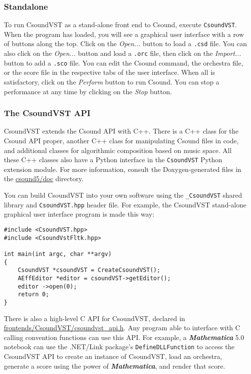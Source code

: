 \documentclass[10pt,letterpaper,onecolumn]{ltxguide}
\begin{document}
\subsubsection{Standalone}

To run CsoundVST as a stand-alone front end to Csound, execute \texttt{CsoundVST}. When the program has loaded, you will see a graphical user interface with a row of buttons along the top. Click on the \emph{Open...} button to load a \texttt{.csd} file. You can also click on the \emph{Open...} button and load a \texttt{.orc} file, then click on the \emph{Import...} button to add a \texttt{.sco} file. You can edit the Csound command, the orchestra file, or the score file in the respective tabs of the user interface. When all is satisfactory, click on the \emph{Perform} button to run Csound. You can stop a performance at any time by clicking on the \emph{Stop} button.

\subsubsection{The CsoundVST API}

CsoundVST extends the Csound API with C++. There is a C++ class for the Csound API proper, another C++ class for manipulating Csound files in code, and additional classes for algorithmic composition based on music space. All these C++ classes also have a Python interface in the \texttt{CsoundVST} Python extension module. For more information, consult the Doxygen-generated files in the \url{csound5/doc} directory.

You can build CsoundVST into your own software using the \texttt{\_CsoundVST} shared library and \texttt{CsoundVST.hpp} header file. For example, the CsoundVST stand-alone graphical user interface program is made this way:

\begin{lstlisting}
#include <CsoundVST.hpp>
#include <CsoundVstFltk.hpp>

int main(int argc, char **argv)
{
    CsoundVST *csoundVST = CreateCsoundVST();
    AEffEditor *editor = csoundVST->getEditor();
    editor ->open(0);
    return 0;
}
\end{lstlisting}

There is also a high-level C API for CsoundVST, declared in \url{frontends/CsoundVST/csoundvst\_api.h}. Any program able to interface with C calling convention functions can use this API. For example, a \textbf{\emph{Mathematica}} 5.0 notebook can use the .NET/Link package's \texttt{DefineDLLFunction} to access the CsoundVST API to create an instance of CsoundVST, load an orchestra, generate a score using the power of \textbf{\emph{Mathematica}}, and render that score.
\end{document}
